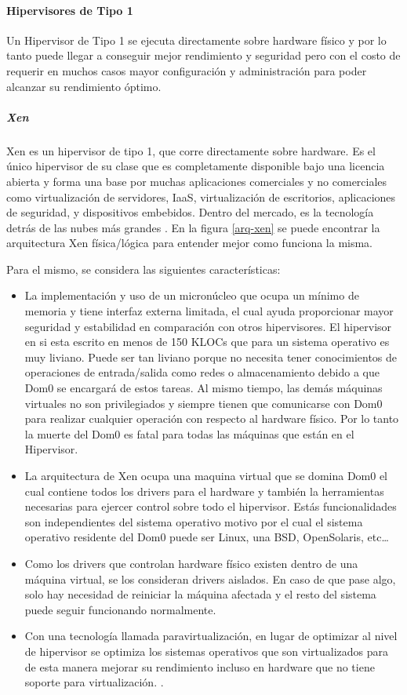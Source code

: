 \paragraph{Hipervisores de Tipo 1}
Un Hipervisor de Tipo 1 se ejecuta directamente sobre hardware físico \citep{IBM-Hypervisors} y por lo tanto puede llegar a conseguir mejor rendimiento y seguridad pero con el costo de requerir en muchos casos mayor configuración y administración para poder alcanzar su rendimiento óptimo.

\subparagraph{Xen}
Xen es un hipervisor de tipo 1, que corre directamente sobre hardware. Es el único hipervisor de su clase que es completamente disponible bajo una licencia abierta y forma una base por muchas aplicaciones comerciales y no comerciales como virtualización de servidores, IaaS, virtualización de escritorios, aplicaciones de seguridad, y dispositivos embebidos. Dentro del mercado, es la tecnología detrás de las nubes más grandes \citep{Xen-Project-Overview}. En la figura \ref{arq-xen} se puede encontrar la arquitectura Xen física/lógica para entender mejor como funciona la misma.
 
Para el mismo, se considera las siguientes características:
\begin{itemize}
	\item La implementación y uso de un micronúcleo que ocupa un mínimo de memoria y tiene interfaz externa limitada, el cual ayuda proporcionar mayor seguridad y estabilidad en comparación con otros hipervisores. El hipervisor en si esta escrito en menos de 150 KLOCs que para un sistema operativo es muy liviano. Puede ser tan liviano porque no necesita tener conocimientos de operaciones de entrada/salida como redes o almacenamiento debido a que Dom0 se encargará de estos tareas. Al mismo tiempo, las demás máquinas virtuales no son privilegiados y siempre tienen que comunicarse con Dom0 para realizar cualquier operación con respecto al hardware físico. Por lo tanto la muerte del Dom0 es fatal para todas las máquinas que están en el Hipervisor.
    \item La arquitectura de Xen ocupa una maquina virtual que se domina Dom0 el cual contiene todos los drivers para el hardware y también la herramientas necesarias para ejercer control sobre todo el hipervisor. Estás funcionalidades son independientes del sistema operativo motivo por el cual el sistema operativo residente del Dom0 puede ser Linux, una BSD, OpenSolaris, etc\ldots
    \item Como los drivers que controlan hardware físico existen dentro de una máquina virtual, se los consideran drivers aislados. En caso de que pase algo, solo hay necesidad de reiniciar la máquina afectada y el resto del sistema puede seguir funcionando normalmente.
    \item Con una tecnología llamada paravirtualización, en lugar de optimizar al nivel de hipervisor se optimiza los sistemas operativos que son virtualizados para de esta manera mejorar su rendimiento incluso en hardware que no tiene soporte para virtualización. \citep{Xen-Project-Overview}.
\end{itemize}

